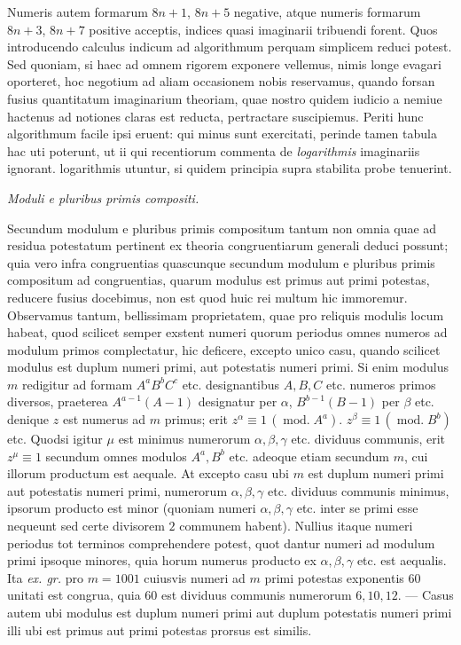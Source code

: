 Numeris autem formarum $8n+1$, $8n+5$ negative, atque numeris formarum $8n+3$, $8n+7$ positive acceptis, indices quasi imaginarii tribuendi forent. Quos introducendo calculus indicum ad algorithmum perquam simplicem reduci potest. Sed quoniam, si haec ad omnem rigorem exponere vellemus, nimis longe evagari oporteret, hoc negotium ad aliam occasionem nobis reservamus, quando forsan fusius quantitatum imaginarium theoriam, quae nostro quidem iudicio a nemiue hactenus ad notiones claras est reducta, pertractare suscipiemus. Periti hunc algorithmum facile ipsi eruent: qui minus sunt exercitati, perinde tamen tabula hac uti poterunt, ut ii qui recentiorum commenta de \emph{logarithmis} imaginariis ignorant. logarithmis utuntur, si quidem principia supra stabilita probe tenuerint.

\begin{center}\small\emph{Moduli e pluribus primis compositi.}\end{center}


Secundum modulum e pluribus primis compositum tantum non omnia quae ad residua potestatum pertinent ex theoria congruentiarum generali deduci possunt; quia vero infra congruentias quascunque secundum modulum e pluribus primis compositum ad congruentias, quarum modulus est primus aut primi potestas, reducere fusius docebimus, non est quod huic rei multum hic immoremur. Observamus tantum, bellissimam proprietatem, quae pro reliquis modulis locum habeat, quod scilicet semper exstent numeri quorum periodus omnes numeros ad modulum primos complectatur, hic deficere, excepto unico casu, quando scilicet modulus est duplum numeri primi, aut potestatis numeri primi.
Si enim modulus $m$ redigitur ad formam $A^aB^bC^c$ etc. designantibus $A,B,C$ etc. numeros primos diversos, praeterea $A^{a-1}(A-1)$ designatur per $\alpha$, $B^{b-1}(B-1)$ per $\beta$ etc. denique $z$ est numerus ad $m$ primus; erit $z^{\alpha}\equiv1\,(\operatorname{mod.}A^a)$. $z^{\beta}\equiv1\,(\operatorname{mod.}B^b)$ etc. Quodsi igitur $\mu$ est minimus numerorum $\alpha,\beta,\gamma$ etc. dividuus communis, erit $z^{\mu}\equiv1$ secundum omnes modulos $A^a,B^b$ etc. adeoque etiam secundum $m$, cui illorum productum est aequale. At excepto casu ubi $m$ est duplum numeri primi aut potestatis numeri primi, numerorum $\alpha,\beta,\gamma$ etc. dividuus communis minimus, ipsorum producto est minor (quoniam numeri $\alpha,\beta,\gamma$ etc. inter se primi esse nequeunt sed certe divisorem $2$ communem habent). Nullius itaque numeri
periodus tot terminos comprehendere potest, quot dantur numeri ad modulum primi ipsoque minores, quia horum numerus producto ex $\alpha,\beta,\gamma$ etc. est aequalis. Ita \emph{ex. gr.} pro $m=1001$ cuiusvis numeri ad $m$ primi potestas exponentis $60$ unitati est congrua, quia $60$ est dividuus communis numerorum $6,10,12$. --- Casus autem ubi modulus est duplum numeri primi aut duplum potestatis numeri primi illi ubi est primus aut primi potestas prorsus est similis.

